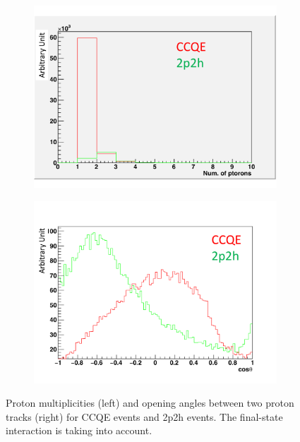 \begin{figure}[tbhp]
 \begin{center}
  \begin{subfigure}{0.48\textwidth}
     \includegraphics[width=\linewidth]{fig/2p2h_proton_multiplicity.pdf}
    \end{subfigure}
  \begin{subfigure}{0.48\textwidth}
    \includegraphics[width=\linewidth]{fig/2p2h_proton_angle.pdf}
    \end{subfigure}    
    \end{center}
  \caption{
Proton multiplicities (left) and opening angles between two proton tracks (right) for CCQE events and 2p2h events.
The final-state interaction is taking into account.
}
\label{fig:2p2h_proton_multiplicity_angle}
\end{figure}


